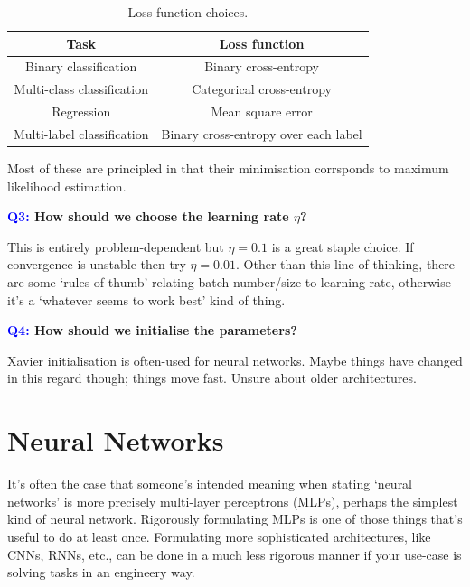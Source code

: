 \documentclass[11pt]{article}
\begin{document}
\begin{table}[ht]
    \begin{center}
        \begin{tabular}{c||c}
            \textbf{Task} & \textbf{Loss function}\\
            \hline
            \hline
            Binary classification & Binary cross-entropy\\
            Multi-class classification & Categorical cross-entropy\\
            Regression & Mean square error\\
            Multi-label classification & Binary cross-entropy over each label\\
            \hline
        \end{tabular}
    \end{center}
    \vspace{-15pt}
    \caption{Loss function choices.}
    \label{tab:loss_func_choices}
\end{table}
\noindent Most of these are principled in that their minimisation corrsponds to maximum likelihood estimation.

\begin{center}
    \textbf{\textcolor{blue}{Q3:} How should we choose the learning rate $\eta$?}
\end{center}
This is entirely problem-dependent but $\eta=0.1$ is a great staple choice. If convergence is unstable then try $\eta=0.01$. Other than this line of thinking, there are some `rules of thumb' relating batch number/size to learning rate, otherwise it's a `whatever seems to work best' kind of thing.

\begin{center}
    \textbf{\textcolor{blue}{Q4:} How should we initialise the parameters?}
\end{center}
Xavier initialisation is often-used for neural networks. Maybe things have changed in this regard though; things move fast. Unsure about older architectures.

\section{Neural Networks}
It's often the case that someone's intended meaning when stating `neural networks' is more precisely multi-layer perceptrons (MLPs), perhaps the simplest kind of neural network. Rigorously formulating MLPs is one of those things that's useful to do at least once. Formulating more sophisticated architectures, like CNNs, RNNs, etc., can be done in a much less rigorous manner if your use-case is solving tasks in an engineery way.\\
\end{document}
